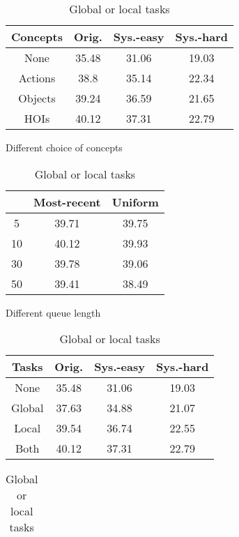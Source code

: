 \documentclass{article} \usepackage{iclr2022_conference,times}
\begin{document}
\begin{table}[h]
    \begin{subtable}[t]{0.49\textwidth}
    \centering
    \begin{tabular}{cccc}
    \toprule
         Concepts & Orig.& Sys.-easy & Sys.-hard  \\
    \midrule
         None &35.48 &31.06 &19.03 \\
         Actions &38.8 &35.14 &22.34 \\
         Objects &39.24 &36.59 &21.65 \\
         HOIs &40.12 &37.31 &22.79 \\
    \bottomrule
    \end{tabular}
    \caption{Different choice of concepts}
    \label{tab:quant_c}
    \end{subtable}
    \hfill
    \setlength\tabcolsep{3pt}
    \begin{subtable}[t]{0.49\textwidth}
        \centering
    \begin{tabular}{ccc}
    \toprule
          & Most-recent &Uniform  \\
    \midrule
         5 &39.71 &39.75  \\
         10 &40.12 &39.93 \\
         30 &39.78 &39.06 \\
         50 &39.41 &38.49 \\
    \bottomrule
    \end{tabular}
    \caption{Different queue length }
    \label{tab:quant_d}
    \end{subtable}
    \vfill
    \setlength\tabcolsep{3pt}
    \begin{subtable}[t]{0.49\textwidth}
        \centering
    \begin{tabular}{cccc}
    \toprule
         Tasks & Orig.& Sys.-easy & Sys.-hard  \\
    \midrule
         None & 35.48 &31.06 &19.03 \\
         Global &37.63 &34.88 &21.07 \\
         Local &39.54 &36.74 &22.55 \\
         Both &40.12 &37.31 &22.79 \\
    \bottomrule
    \end{tabular}
    \caption{Global or local tasks}
    \label{tab:quant_e}
    \end{subtable}
    \hfill
    \setlength\tabcolsep{3pt}
    \begin{subtable}[t]{0.49\textwidth}
    \centering
    \begin{tabular}{cccc}

\end{tabular}
\end{subtable}
\end{table}
\end{document}
